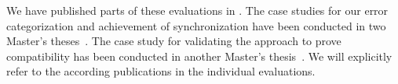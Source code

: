 

We have published parts of these evaluations in \cite{klare2019icmt,klare2020compatibility-report,gleitze2020orchestration}. The case studies for our error categorization and achievement of synchronization have been conducted in two Master's theses~\cite{syma2018ma,saglam2020ma}. The case study for validating the approach to prove compatibility has been conducted in another Master's thesis~\cite{pepin2019ma}. We will explicitly refer to the according publications in the individual evaluations.






